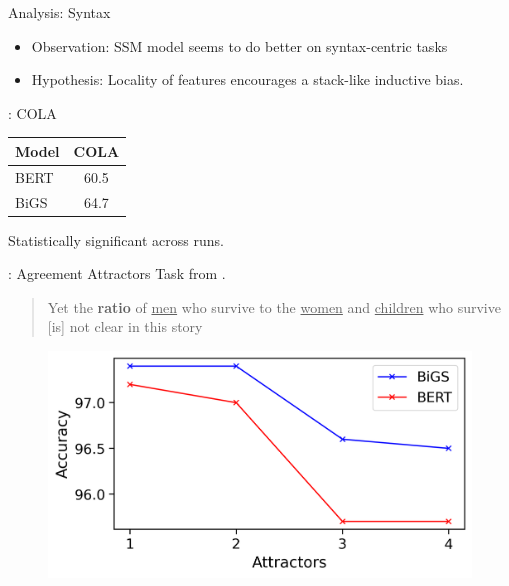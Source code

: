 \documentclass[14pt,aspectratio=169]{beamer}
\begin{document}
\begin{frame}{Analysis: Syntax}
\begin{itemize}
    \item Observation: SSM model seems to do better on syntax-centric tasks 
    \item Hypothesis: Locality of features encourages a stack-like inductive bias. 
\end{itemize}
\end{frame}

\begin{frame}{: COLA}
    \begin{table}
    \begin{tabular}{lc}
        \toprule
        Model & COLA \\
        \midrule 
         BERT &  60.5\\ 
         BiGS &  64.7 \\ 
        \bottomrule
    \end{tabular}
    \end{table}
    Statistically significant across runs.
\end{frame}


\begin{frame}{: Agreement Attractors}
    Task from \cite{linzen2016assessing,goldberg2019assessing}.
\vspace{0.5cm}

    \begin{quote}        
    Yet the \textbf{ratio} of \underline{men} who survive to the \underline{women} and \underline{children} who survive [is] not clear in this story
    \end{quote}

    \begin{figure}
        \centering
        \includegraphics[height=0.5\textheight]{Figs/attractors.png}
        \label{fig:my_label}
    \end{figure}
    
\end{frame}
\end{document}

